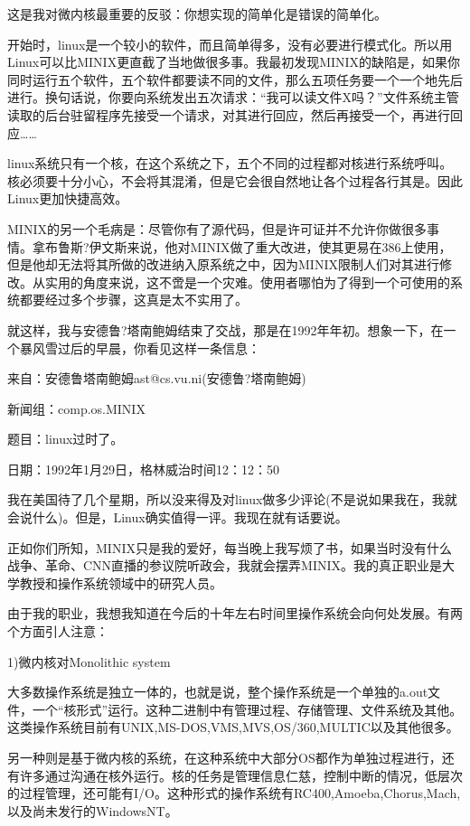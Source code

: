 这是我对微内核最重要的反驳：你想实现的简单化是错误的简单化。

开始时，linux是一个较小的软件，而且简单得多，没有必要进行模式化。所以用Linux可以比MINIX更直截了当地做很多事。我最初发现MINIX的缺陷是，如果你同时运行五个软件，五个软件都要读不同的文件，那么五项任务要一个一个地先后进行。换句话说，你要向系统发出五次请求：“我可以读文件X吗？”文件系统主管读取的后台驻留程序先接受一个请求，对其进行回应，然后再接受一个，再进行回应……

linux系统只有一个核，在这个系统之下，五个不同的过程都对核进行系统呼叫。核必须要十分小心，不会将其混淆，但是它会很自然地让各个过程各行其是。因此Linux更加快捷高效。

MINIX的另一个毛病是：尽管你有了源代码，但是许可证并不允许你做很多事情。拿布鲁斯?伊文斯来说，他对MINIX做了重大改进，使其更易在386上使用，但是他却无法将其所做的改进纳入原系统之中，因为MINIX限制人们对其进行修改。从实用的角度来说，这不啻是一个灾难。使用者哪怕为了得到一个可使用的系统都要经过多个步骤，这真是太不实用了。

就这样，我与安德鲁?塔南鲍姆结束了交战，那是在1992年年初。想象一下，在一个暴风雪过后的早晨，你看见这样一条信息：

 

来自：安德鲁塔南鲍姆ast@cs.vu.ni(安德鲁?塔南鲍姆)

新闻组：comp.os.MINIX

题目：linux过时了。

日期：1992年1月29日，格林威治时间12：12：50

 

我在美国待了几个星期，所以没来得及对linux做多少评论(不是说如果我在，我就会说什么)。但是，Linux确实值得一评。我现在就有话要说。

正如你们所知，MINIX只是我的爱好，每当晚上我写烦了书，如果当时没有什么战争、革命、CNN直播的参议院听政会，我就会摆弄MINIX。我的真正职业是大学教授和操作系统领域中的研究人员。

由于我的职业，我想我知道在今后的十年左右时间里操作系统会向何处发展。有两个方面引人注意：

1)微内核对Monolithic system

大多数操作系统是独立一体的，也就是说，整个操作系统是一个单独的a.out文件，一个“核形式”运行。这种二进制中有管理过程、存储管理、文件系统及其他。这类操作系统目前有UNIX,MS-DOS,VMS,MVS,OS/360,MULTIC以及其他很多。

另一种则是基于微内核的系统，在这种系统中大部分OS都作为单独过程进行，还有许多通过沟通在核外运行。核的任务是管理信息仁慈，控制中断的情况，低层次的过程管理，还可能有I/O。这种形式的操作系统有RC400,Amoeba,Chorus,Mach,以及尚未发行的WindowsNT。

